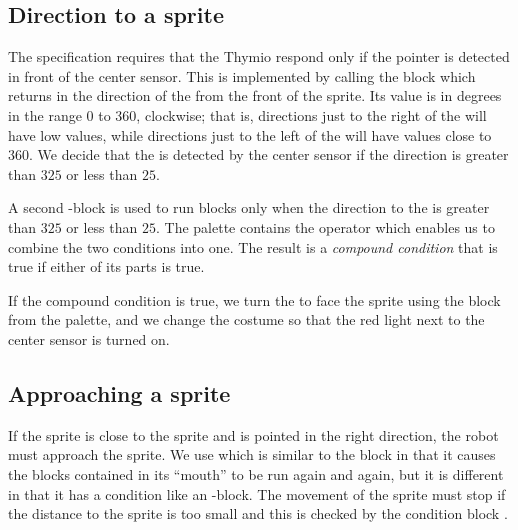 \subsection*{Direction to a sprite}

The specification requires that the Thymio respond only if the pointer
is detected in front of the center sensor. This is implemented by
calling the block  which returns in
 the direction of the  from the
front of the  sprite. Its value is in degrees in the range 0 to
360, clockwise; that is, directions just to the right of the  will
have low values, while directions just to the left of the  will
have values close to $360$. We decide that the  is detected by
the center sensor if the direction is greater than $325$ or less than $25$.


A second -block is used to run blocks only when the direction to
the  is greater than $325$ or less than $25$. The 
palette contains the operator  which enables us to combine
the two conditions into one. The result is a \emph{compound condition}
that is true if either of its parts is true.

If the compound condition is true, we turn the  to face the
 sprite using the block  from the
 palette, and we change the costume so that the red light
next to the center sensor is turned on.


\subsection*{Approaching a sprite}

If the  sprite is close to the  sprite and is pointed in
the right direction, the robot must approach the sprite. We use
 which is similar to the  block in
that it causes the blocks contained in its ``mouth'' to be run again and
again, but it is different in that it has a condition like an
-block. The movement of the  sprite must stop if the
distance to the  sprite is too small and this is checked by
the condition block .
